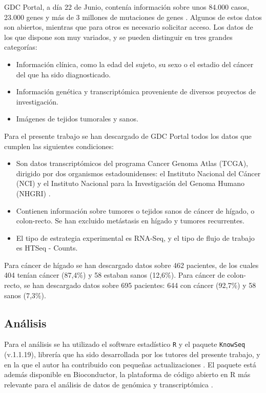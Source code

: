 GDC Portal, a día 22 de Junio, contenía información sobre unos 84.000 casos, 23.000 genes y más de 3 millones de mutaciones de genes \cite{GDCPortal}. Algunos de estos datos son abiertos, mientras que para otros es necesario solicitar acceso. Los datos de los que dispone son muy variados, y se pueden distinguir en tres grandes categorías:

\begin{itemize}
	\item Información clínica, como la edad del sujeto, su sexo o el estadio del cáncer del que ha sido diagnosticado.
	\item Información genética y transcriptómica proveniente de diversos proyectos de investigación.
	\item Imágenes de tejidos tumorales y sanos.
\end{itemize} 

Para el presente trabajo se han descargado de GDC Portal todos los datos que cumplen las siguientes condiciones:

\begin{itemize}
	\item Son datos transcriptómicos del programa Cancer Genoma Atlas (TCGA), dirigido por dos organismos estadounidenses: el Instituto Nacional del Cáncer (NCI) y el Instituto Nacional para la Investigación del Genoma Humano (NHGRI) \cite{NationalCancerInstitutea}. 
	\item Contienen información sobre tumores o tejidos sanos de cáncer de hígado, o colon-recto. Se han excluido metástasis en hígado y tumores recurrentes.
	\item El tipo de estrategia experimental es RNA-Seq, y el tipo de flujo de trabajo es HTSeq - Counts.
\end{itemize}

Para cáncer de hígado se han descargado datos sobre 462 pacientes, de los cuales 404 tenían cáncer (87,4\%) y 58 estaban sanos (12,6\%).  Para cáncer de colon-recto, se han descargado datos sobre 695 pacientes: 644 con cáncer (92,7\%) y 58 sanos (7,3\%).

\subsection{Análisis}

Para el análisis se ha utilizado el software estadístico \texttt{R} \cite{R} y el paquete \texttt{KnowSeq} (v.1.1.19), librería que ha sido desarrollada por los tutores del presente trabajo, y en la que el autor ha contribuido con pequeñas actualizaciones \cite{KnowSeq}. El paquete está además disponible en Bioconductor, la plataforma de código abierto en R más relevante para el análisis de datos de genómica y transcriptómica \cite{Gentleman2004}.\\

